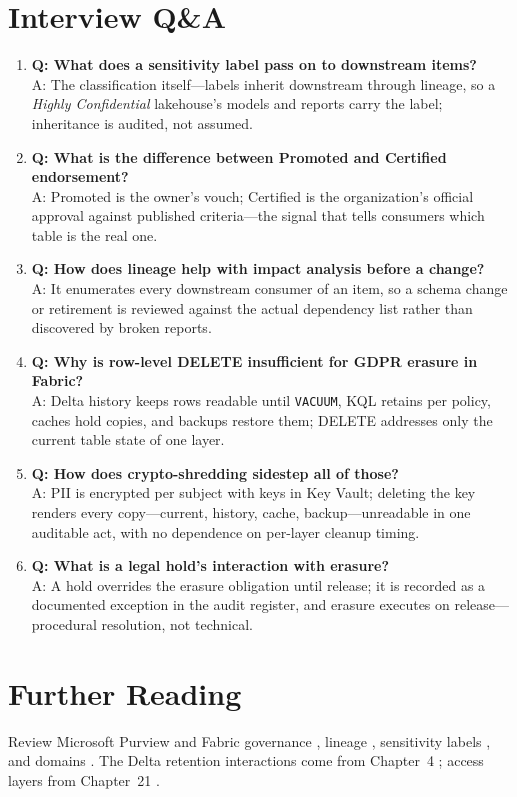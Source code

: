 \section{Interview Q\&A}
\begin{enumerate}
    \item \textbf{Q: What does a sensitivity label pass on to downstream items?}\\
    A: The classification itself---labels inherit downstream through lineage, so a \emph{Highly Confidential} lakehouse's models and reports carry the label; inheritance is audited, not assumed.
    \item \textbf{Q: What is the difference between Promoted and Certified endorsement?}\\
    A: Promoted is the owner's vouch; Certified is the organization's official approval against published criteria---the signal that tells consumers which table is the real one.
    \item \textbf{Q: How does lineage help with impact analysis before a change?}\\
    A: It enumerates every downstream consumer of an item, so a schema change or retirement is reviewed against the actual dependency list rather than discovered by broken reports.
    \item \textbf{Q: Why is row-level DELETE insufficient for GDPR erasure in Fabric?}\\
    A: Delta history keeps rows readable until \texttt{VACUUM}, KQL retains per policy, caches hold copies, and backups restore them; DELETE addresses only the current table state of one layer.
    \item \textbf{Q: How does crypto-shredding sidestep all of those?}\\
    A: PII is encrypted per subject with keys in Key Vault; deleting the key renders every copy---current, history, cache, backup---unreadable in one auditable act, with no dependence on per-layer cleanup timing.
    \item \textbf{Q: What is a legal hold's interaction with erasure?}\\
    A: A hold overrides the erasure obligation until release; it is recorded as a documented exception in the audit register, and erasure executes on release---procedural resolution, not technical.
\end{enumerate}

\section{Further Reading}
Review Microsoft Purview and Fabric governance \cite{microsoftPurviewFabric}, lineage \cite{microsoftFabricLineage}, sensitivity labels \cite{microsoftFabricLabels}, and domains \cite{microsoftDomains}. The Delta retention interactions come from Chapter~4 \cite{microsoftFabricVacuum,deltaLakeDocs}; access layers from Chapter~21 \cite{microsoftFabricSecurity}.

